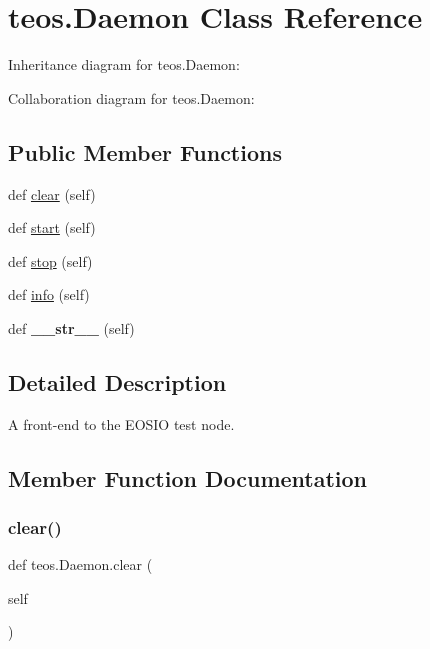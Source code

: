\hypertarget{classteos_1_1Daemon}{}\section{teos.\+Daemon Class Reference}
\label{classteos_1_1Daemon}


Inheritance diagram for teos.\+Daemon\+:


Collaboration diagram for teos.\+Daemon\+:
\subsection*{Public Member Functions}
\begin{DoxyCompactItemize}
\item 
def \mbox{\hyperlink{classteos_1_1Daemon_a7931bb554858bb06c76836c62b5cd99e}{clear}} (self)
\item 
def \mbox{\hyperlink{classteos_1_1Daemon_add7344f11f4cb6e389d956bacb8f0cc0}{start}} (self)
\item 
def \mbox{\hyperlink{classteos_1_1Daemon_af9cd65cfb597eadcf18ba5c82963202e}{stop}} (self)
\item 
def \mbox{\hyperlink{classteos_1_1Daemon_a3bd22437bedc3d98bf14862d8410d7e0}{info}} (self)
\item 
\mbox{\label{classteos_1_1Daemon_aaebbd4ea0eac7ee409cfa2c0f1351d9b}} 
def {\bfseries \+\_\+\+\_\+str\+\_\+\+\_\+} (self)
\end{DoxyCompactItemize}


\subsection{Detailed Description}
\begin{DoxyVerb}A front-end to the EOSIO test node.
\end{DoxyVerb}
 

\subsection{Member Function Documentation}
\mbox{\label{classteos_1_1Daemon_a7931bb554858bb06c76836c62b5cd99e}} 
\subsubsection{\texorpdfstring{clear()}{clear()}}
{\footnotesize\ttfamily def teos.\+Daemon.\+clear (\begin{DoxyParamCaption}\item[{}]{self }\end{DoxyParamCaption})}

